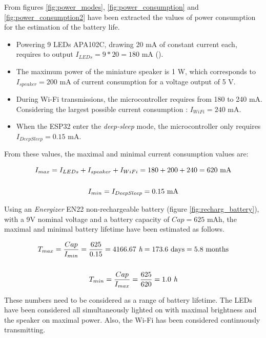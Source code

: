 \newpage From figures \ref{fig:power_modes}, \ref{fig:power_consumption} and \ref{fig:power_consumption2} have been extracted the values of power consumption for the estimation of the battery life.

\begin{itemize}
    \item Powering 9 LEDs APA102C, drawing 20 mA of constant current each, requires to output $I_{LEDs} = 9*20 = 180$ mA (\cite{ledstripspec}).
    \item The maximum power of the miniature speaker is 1 W, which corresponds to $I_{speaker} = 200$ mA of current consumption for a voltage output of 5 V.
    \item During Wi-Fi transmissions, the microcontroller requires from 180 to 240 mA. Considering the largest possible current consumption : $I_{WiFi} = 240$ mA.
    \item When the ESP32 enter the \textit{deep-sleep} mode, the microcontroller only requires \\$I_{DeepSleep} = 0.15$ mA.
\end{itemize}

\medskip From these values, the maximal and minimal current consumption values are:

\begin{gather}
    I_{max} = I_{LEDs} + I_{speaker} + I_{WiFi} = 180 + 200 + 240 = 620 \text{ mA} \\ \notag\\
    I_{min} = I_{DeepSleep} = 0.15 \text{ mA} 
\end{gather}

\medskip Using an \textit{Energizer} EN22 non-rechargeable battery (figure \ref{fig:recharg_battery}), with a 9V nominal voltage and a battery capacity of $Cap = 625$ mAh, the maximal and minimal battery lifetime have been estimated as follows.

\begin{gather}
    T_{max} = \frac{Cap}{I_{min}} = \frac{625}{0.15} = 4166.67 \textit{ h} = 173.6 \text{ days} = 5.8 \text{ months}\\ \notag \\
    T_{min} = \frac{Cap}{I_{max}} = \frac{625}{620} = 1.0 \textit{ h}
\end{gather}

These numbers need to be considered as a range of battery lifetime. The LEDs have been considered all simultaneously lighted on with maximal brightness and the speaker on maximal power. Also, the Wi-Fi has been considered continuously transmitting.

